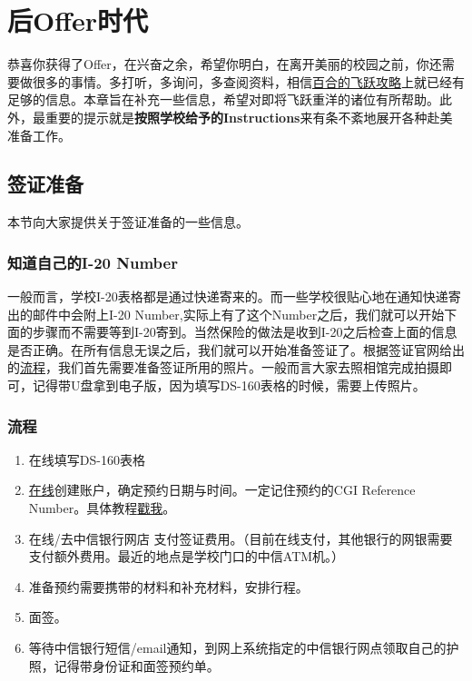 \chapter{后Offer时代}
\newpage
恭喜你获得了Offer，在兴奋之余，希望你明白，在离开美丽的校园之前，你还需要做很多的事情。多打听，多询问，多查阅资料，相信\href{http://bbs.nju.edu.cn/file/S/superphoenix/LSFF.htm}{百合的飞跃攻略}上就已经有足够的信息。本章旨在补充一些信息，希望对即将飞跃重洋的诸位有所帮助。此外，最重要的提示就是\textbf{按照学校给予的Instructions}来有条不紊地展开各种赴美准备工作。
\section{签证准备}
本节向大家提供关于签证准备的一些信息。
\subsection{知道自己的I-20 Number}
一般而言，学校I-20表格都是通过快递寄来的。而一些学校很贴心地在通知快递寄出的邮件中会附上I-20 Number,实际上有了这个Number之后，我们就可以开始下面的步骤而不需要等到I-20寄到。当然保险的做法是收到I-20之后检查上面的信息是否正确。在所有信息无误之后，我们就可以开始准备签证了。根据签证官网给出的\href{http://www.ustraveldocs.com/cn_zh/cn-niv-visaapply.asp}{流程}，我们首先需要准备签证所用的照片。一般而言大家去照相馆完成拍摄即可，记得带U盘拿到电子版，因为填写DS-160表格的时候，需要上传照片。\par
\subsection{流程}
\begin{enumerate}
\item 在线填写DS-160表格
\item \href{https://cgifederal.secure.force.com/?language=Chinese\%20(Simplified)\&country=China}{在线}创建账户，确定预约日期与时间。一定记住预约的CGI Reference Number。具体教程\href{http://www.usaqianzheng.com/2013/03/\%E5\%A6\%82\%E4\%BD\%95\%E8\%8E\%B7\%E5\%BE\%97\%E7\%BE\%8E\%E5\%9B\%BD\%E7\%AD\%BE\%E8\%AF\%81\%E7\%9A\%84cgi\%E5\%8F\%B7\%E7\%A0\%81\%EF\%BC\%8Ccgi\%E7\%BC\%96\%E5\%8F\%B7\%E5\%9C\%A8\%E5\%93\%AA\%E9\%87\%8C\%E6\%89\%BE\%EF\%BC\%9Fcgi-reference-number.html}{戳我}。
\item 在线/去中信银行网店 支付签证费用。（目前在线支付，其他银行的网银需要支付额外费用。最近的地点是学校门口的中信ATM机。）
\item 准备预约需要携带的材料和补充材料，安排行程。
\item 面签。
\item 等待中信银行短信/email通知，到网上系统指定的中信银行网点领取自己的护照，记得带身份证和面签预约单。
\end{enumerate}\par

